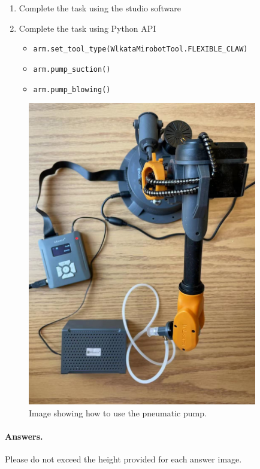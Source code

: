     \begin{enumerate}
        \item Complete the task using the studio software
        \item Complete the task using Python API
        \begin{itemize}
        \item \texttt{arm.set\_tool\_type(WlkataMirobotTool.FLEXIBLE\_CLAW)}
        \item \texttt{arm.pump\_suction()}
        \item \texttt{arm.pump\_blowing()}
        \end{itemize}
    \end{enumerate}
     \begin{figure}[H]
   \centering
    \vspace*{-0.0 in}
    \includegraphics[width=10cm]{image/vacuumsetup.jpg}
    \caption*{Image showing how to use the pneumatic pump.}
\end{figure}

\newpage
\paragraph{Answers.}
Please do not exceed the height provided for each answer image.

